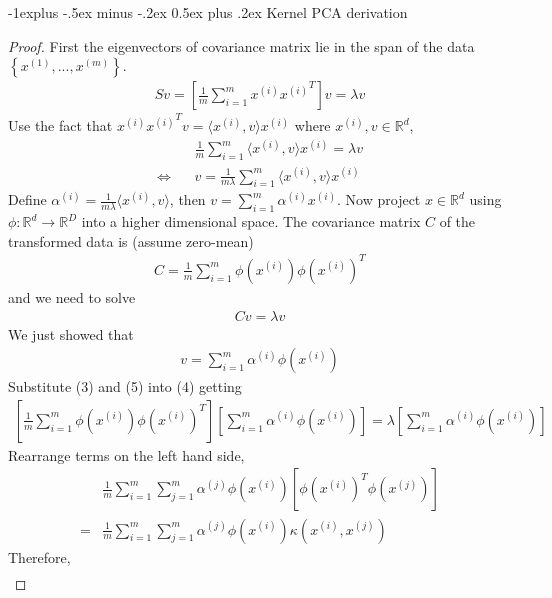 \documentclass[8pt,landscape]{article}
\makeatletter
\renewcommand{\subsection}{\@startsection{subsection}{2}{0mm}%
                                {-1explus -.5ex minus -.2ex}%
                                {0.5ex plus .2ex}%
                                {\normalfont\small\bfseries}}
\makeatother
\begin{document}
\begin{multicols}{3}
\subsection{Kernel PCA derivation}
\begin{proof}
	First the eigenvectors of covariance matrix lie in the span of the data $\left\{ x^{(1)}, ..., x^{(m)} \right\}$.
	\begin{align*}
		Sv = \left[ \frac{1}{m} \sum_{i=1}^m x^{(i)}{x^{(i)}}^T \right]v = \lambda v
	\end{align*}
	Use the fact that $x^{(i)} {x^{(i)}}^T v = \langle x^{(i)}, v \rangle x^{(i)}$ where $x^{(i)}, v \in \mathbb{R}^d$,
	\begin{align*}
		&\frac{1}{m} \sum_{i=1}^m \langle x^{(i)}, v \rangle x^{(i)} = \lambda v\\
		\Leftrightarrow \ \ \ \ &v = \frac{1}{m \lambda} \sum_{i=1}^m \langle x^{(i)}, v \rangle x^{(i)}
	\end{align*}
	Define $\alpha^{(i)} = \frac{1}{m \lambda} \langle x^{(i)}, v \rangle$, then $v = \sum_{i=1}^m \alpha^{(i)} x^{(i)}$. Now project $x \in \mathbb{R}^d$ using $\phi: \mathbb{R}^d \rightarrow \mathbb{R}^D$ into a higher dimensional space. The covariance matrix $C$ of the transformed data is (assume zero-mean)
	\begin{align}
		C = \frac{1}{m} \sum_{i=1}^m \phi(x^{(i)}) \phi(x^{(i)})^T
	\end{align}
	and we need to solve
	\begin{align}
		Cv = \lambda v
	\end{align}
	We just showed that
	\begin{align}
		v = \sum_{i=1}^m \alpha^{(i)} \phi(x^{(i)})
	\end{align}
	Substitute (3) and (5) into (4) getting
	\begin{align*}
		\left[ \frac{1}{m} \sum_{i=1}^m \phi(x^{(i)}) \phi(x^{(i)})^T \right] \left[ \sum_{i=1}^m \alpha^{(i)} \phi(x^{(i)}) \right] = \lambda \left[ \sum_{i=1}^m \alpha^{(i)} \phi(x^{(i)}) \right]
	\end{align*}
	Rearrange terms on the left hand side,
	\begin{align*}
		&\frac{1}{m} \sum_{i=1}^m \sum_{j=1}^m \alpha^{(j)} \phi(x^{(i)}) \left[ {\phi(x^{(i)})}^T \phi(x^{(j)}) \right]\\
		=&\frac{1}{m} \sum_{i=1}^m \sum_{j=1}^m \alpha^{(j)} \phi(x^{(i)}) \kappa(x^{(i)}, x^{(j)})
	\end{align*}
	Therefore,
	\begin{align*}

\end{align*}
\end{proof}
\end{multicols}
\end{document}
